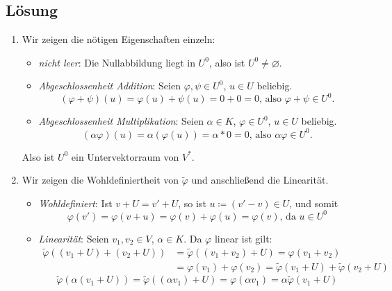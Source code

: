 \subsection{Lösung}
\begin{enumerate}
	\item Wir zeigen die nötigen Eigenschaften einzeln:
	\begin{itemize}
		\item \emph{nicht leer}: Die Nullabbildung liegt in \( U^0 \), also ist \( U^0 \neq \varnothing \).
		\item \emph{Abgeschlossenheit Addition}: Seien \( \varphi, \psi \in U^0 \), \( u \in U \) beliebig.
		\begin{equation*}
		 	(\varphi + \psi)(u) = \varphi(u) + \psi(u) = 0+0 = 0\text{, also } \varphi + \psi \in U^0\text{.}
		 \end{equation*} 
		 \item \emph{Abgeschlossenheit Multiplikation}: Seien \( \alpha \in K \), \( \varphi \in U^0 \), \( u \in U \) beliebig.
		 \begin{equation*}
		 	(\alpha \varphi)(u) = \alpha(\varphi(u)) = \alpha * 0 = 0\text{, also } \alpha \varphi \in U^0\text{.}
		 \end{equation*}
	\end{itemize}
	Also ist \( U^0 \) ein Untervektorraum von \( V^\ast \).

	\item Wir zeigen die Wohldefiniertheit von \( \widetilde{\varphi} \) und anschließend die Linearität.
	\begin{itemize}
		\item \emph{Wohldefiniert}: Ist \( v + U = v' + U \), so ist \( u \coloneqq (v' - v) \in U \), und somit
		\begin{equation*}
		 	\varphi(v') = \varphi(v+u) = \varphi(v) + \varphi(u) = \varphi(v)\text{, da } u \in U^0
		 \end{equation*} 

		 \item \emph{Linearität}: Seien \( v_1, v_2 \in V \), \( \alpha \in K \). Da \( \varphi \) linear ist gilt:
		 \begin{align*}
		 	\widetilde{\varphi}((v_1 + U) + (v_2 + U)) &= \widetilde{\varphi}((v_1 + v_2) + U) = \varphi(v_1 + v_2) \\
		 	 &= \varphi(v_1) + \varphi(v_2) = \widetilde{\varphi}(v_1 + U) + \widetilde{\varphi}(v_2 + U)
		 \end{align*}
		 \begin{equation*}
		 	\widetilde{\varphi}(\alpha(v_1 + U)) = \widetilde{\varphi}((\alpha v_1) + U) = \varphi(\alpha v_1) = \alpha \widetilde{\varphi}(v_1 + U)
		 \end{equation*}
	\end{itemize}


\end{enumerate}
